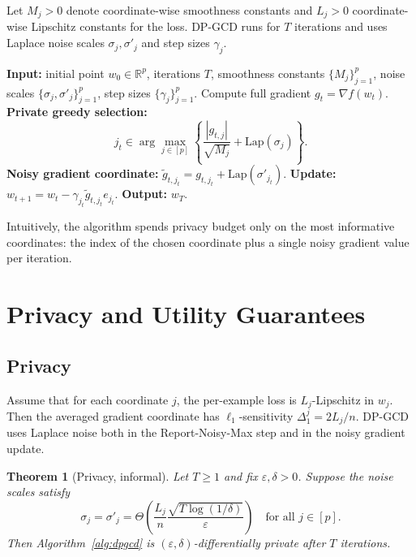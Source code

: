 \documentclass[11pt,a4paper]{article}
\newtheorem{theorem}{Theorem}
\begin{document}
Let \(M_j > 0\) denote coordinate-wise smoothness constants and \(L_j > 0\) coordinate-wise Lipschitz constants for the loss. DP-GCD runs for \(T\) iterations and uses Laplace noise scales \(\sigma_j,\sigma'_j\) and step sizes \(\gamma_j\).

\begin{algorithm}[h]
\caption{DP-GCD (Differentially Private Greedy Coordinate Descent)}
\label{alg:dpgcd}
\begin{algorithmic}[1]
\State \textbf{Input:} initial point \(w_0 \in \mathbb{R}^p\), iterations \(T\), smoothness constants \(\{M_j\}_{j=1}^p\), noise scales \(\{\sigma_j,\sigma'_j\}_{j=1}^p\), step sizes \(\{\gamma_j\}_{j=1}^p\).
  \State Compute full gradient \(g_t = \nabla f(w_t)\).
  \State \textbf{Private greedy selection:}
  \[
    j_t \in \arg\max_{j \in [p]} \left\{ \frac{|g_{t,j}|}{\sqrt{M_j}} + \text{Lap}(\sigma_j) \right\}.
  \]
  \State \textbf{Noisy gradient coordinate:}
    \(\tilde g_{t,j_t} = g_{t,j_t} + \text{Lap}(\sigma'_{j_t})\).
  \State \textbf{Update:}
    \(w_{t+1} = w_t - \gamma_{j_t} \tilde g_{t,j_t} e_{j_t}\).
\EndFor
\State \textbf{Output:} \(w_T\).
\end{algorithmic}
\end{algorithm}

Intuitively, the algorithm spends privacy budget only on the most informative coordinates: the index of the chosen coordinate plus a single noisy gradient value per iteration.

\section{Privacy and Utility Guarantees}

\subsection{Privacy}

Assume that for each coordinate \(j\), the per-example loss is \(L_j\)-Lipschitz in \(w_j\). Then the averaged gradient coordinate has \(\ell_1\)-sensitivity \(\Delta^j_1 = 2L_j/n\). DP-GCD uses Laplace noise both in the Report-Noisy-Max step and in the noisy gradient update.

\begin{theorem}[Privacy, informal]
\label{thm:privacy}
Let \(T \ge 1\) and fix \(\varepsilon,\delta > 0\). Suppose the noise scales satisfy
\[
  \sigma_j = \sigma'_j
  = \Theta\!\left(\frac{L_j}{n} \frac{\sqrt{T \log(1/\delta)}}{\varepsilon}\right)
  \quad \text{for all } j \in [p].
\]
Then Algorithm~\ref{alg:dpgcd} is \((\varepsilon,\delta)\)-differentially private after \(T\) iterations.
\end{theorem}
\end{document}

